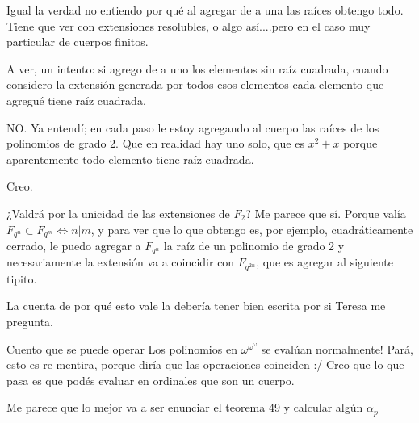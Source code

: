 \documentclass[10pt,spanish]{beamer}
\begin{document}
\begin{frame}

Igual la verdad no entiendo por qué al agregar de a una las raíces obtengo todo. Tiene que ver con extensiones resolubles, o algo así....pero en el caso muy particular de cuerpos finitos.

A ver, un intento: si agrego de a uno los elementos sin raíz cuadrada, cuando considero la extensión generada por todos esos elementos cada elemento que agregué tiene raíz cuadrada.

NO. Ya entendí; en cada paso le estoy agregando al cuerpo las raíces de los polinomios de grado 2. Que en realidad hay uno solo, que es $x^2+x$ porque aparentemente todo elemento tiene raíz cuadrada.

Creo.

¿Valdrá por la unicidad de las extensiones de $F_2$? Me parece que sí. Porque valía $F_{q^n} \subset F_{q^m} \Leftrightarrow n|m$, y para ver que lo que obtengo es, por ejemplo, cuadráticamente cerrado, le puedo agregar a $F_{q^n}$ la raíz de un polinomio de grado 2 y necesariamente la extensión va a coincidir con $F_{q^{2n}}$, que es agregar al siguiente tipito.

La cuenta de por qué esto vale la debería tener bien escrita por si Teresa me pregunta.

\end{frame}


\begin{frame}{Cuento que se puede operar}
	Los polinomios en $\omega^{\omega^\omega}$ se evalúan normalmente! Pará, esto es re mentira, porque diría que las operaciones coinciden :/
	Creo que lo que pasa es que podés evaluar en ordinales que son un cuerpo.
\end{frame}

\begin{frame}
	Me parece que lo mejor va a ser enunciar el teorema  49 y calcular algún $\alpha_p$
\end{frame}

\fi
\end{document}
